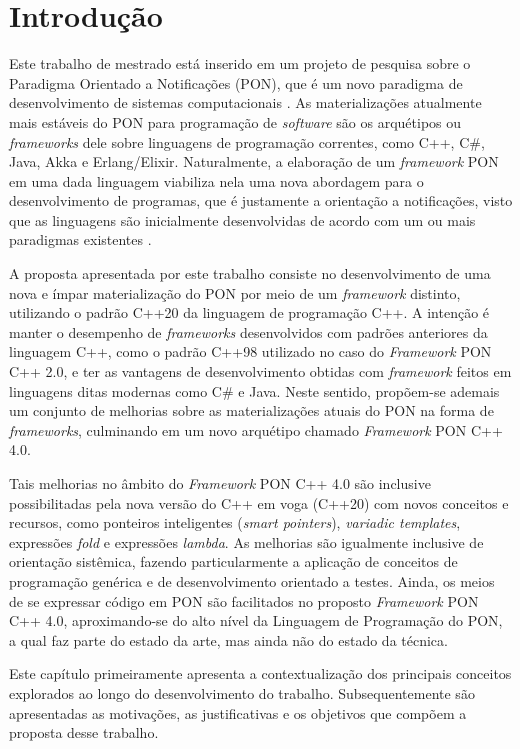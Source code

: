 \chapter{Introdução}\label{ch:introducao}

Este trabalho de mestrado está inserido em um projeto de pesquisa sobre o
Paradigma Orientado a Notificações (PON), que é um novo paradigma de
desenvolvimento de sistemas computacionais \cite{doc_simao_2005}. As
materializações atualmente mais estáveis do PON para programação de
\textit{software} são os arquétipos ou \textit{frameworks} dele sobre linguagens
de programação correntes, como C++, C\#, Java, Akka e Erlang/Elixir.
Naturalmente, a elaboração de um \textit{framework} PON em uma dada linguagem
viabiliza nela uma nova abordagem para o desenvolvimento de programas, que é
justamente a orientação a notificações, visto que as linguagens são inicialmente
desenvolvidas de acordo com um ou mais paradigmas existentes
\cite{van_roy_2012}.

A proposta apresentada por este trabalho consiste no desenvolvimento de uma nova
e ímpar materialização do PON por meio de um \textit{framework} distinto,
utilizando o padrão C++20 da linguagem de programação C++. A intenção é manter o
desempenho de \textit{frameworks} desenvolvidos com padrões anteriores da
linguagem C++, como o padrão C++98 utilizado no caso do \textit{Framework} PON
C++ 2.0, e ter as vantagens de desenvolvimento obtidas com \textit{framework}
feitos em linguagens ditas modernas como C\# e Java. Neste sentido, propõem-se
ademais um conjunto de melhorias sobre as materializações atuais do PON na forma
de \textit{frameworks}, culminando em um novo arquétipo chamado
\textit{Framework} PON C++ 4.0.

Tais melhorias no âmbito do \textit{Framework} PON C++ 4.0 são inclusive
possibilitadas pela nova versão do C++ em voga (C++20) com novos conceitos e
recursos, como ponteiros inteligentes (\textit{smart pointers}),
\textit{variadic templates}, expressões \textit{fold} e expressões
\textit{lambda}. As melhorias são igualmente inclusive de orientação sistêmica,
fazendo particularmente a aplicação de conceitos de programação genérica e de
desenvolvimento orientado a testes. Ainda, os meios de se expressar código em
PON são facilitados no proposto \textit{Framework} PON C++ 4.0, aproximando-se
do alto nível da Linguagem de Programação do PON, a qual faz parte do estado da
arte, mas ainda não do estado da técnica.

Este capítulo primeiramente apresenta a contextualização dos principais
conceitos explorados ao longo do desenvolvimento do trabalho. Subsequentemente
são apresentadas as motivações, as justificativas e os objetivos que compõem a
proposta desse trabalho.


